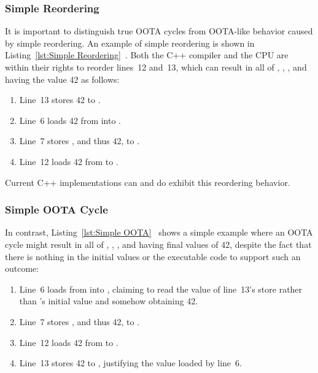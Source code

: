 \documentclass[10]{article}
\begin{document}
\subsubsection{Simple Reordering}
\label{sec:Simple Reordering}

It is important to distinguish true OOTA cycles from OOTA-like
behavior caused by simple reordering.
An example of simple reordering is shown in
Listing~\ref{lst:Simple Reordering}~\cite{PaulEMcKenney2020RelaxedGuideRelaxed}.
Both the C++ compiler and the CPU are within their rights to reorder
lines~12 and~13, which can result in all of , , ,
and  having the value 42 as follows:
\begin{enumerate}
\item   Line~13 stores 42 to .
\item   Line~6 loads 42 from  into .
\item   Line~7 stores , and thus 42, to .
\item   Line~12 loads 42 from  to .
\end{enumerate}
Current C++ implementations can and do exhibit this reordering behavior.

\subsubsection{Simple OOTA Cycle}
\label{sec:Simple OOTA Cycle}

In contrast,
Listing~\ref{lst:Simple OOTA}~\cite{PaulEMcKenney2020RelaxedGuideRelaxed}
shows a simple example where an OOTA cycle might result in all of ,
, , and  having final values of 42, despite the fact
that there is nothing in the initial values or the executable code to
support such an outcome:

\begin{enumerate}
\item   Line~6 loads from  into , claiming to read
	the value of line~13's store rather than 's initial value
	and somehow obtaining 42.
\item   Line~7 stores , and thus 42, to .
\item   Line~12 loads 42 from  to .
\item   Line~13 stores 42 to , justifying the value loaded by line~6.
\end{enumerate}
\end{document}
